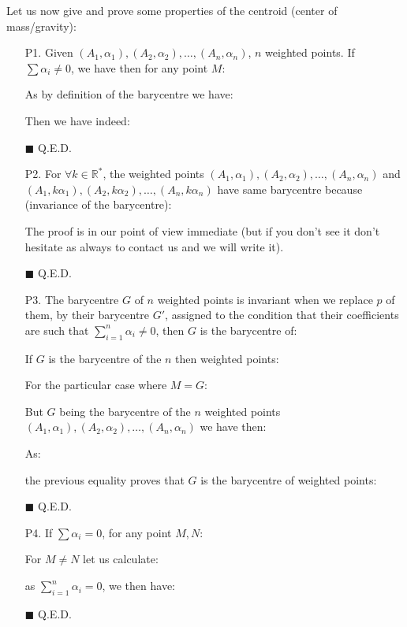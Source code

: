 	Let us now give and prove some properties of the centroid (center of mass/gravity):
	\begin{enumerate}
		\item[P1.] Given $(A_1,\alpha_1),(A_2,\alpha_2),\ldots,(A_n,\alpha_n)$, $n$ weighted points. If $\sum\alpha_i\neq 0$, we have then for any point $M$:
		
		\begin{dem}
		
		As by definition of the barycentre we have:
		
		Then we have indeed:
		
		\begin{flushright}
			$\blacksquare$  Q.E.D.
		\end{flushright}
		\end{dem}

		\item[P2.] For $\forall k\in\mathbb{R}^{*}$, the weighted points $(A_1,\alpha_1),(A_2,\alpha_2),\ldots,(A_n,\alpha_n)$ and $(A_1,k\alpha_1),(A_2,k\alpha_2),\ldots,(A_n,k\alpha_n)$ have same barycentre because (invariance of the barycentre):
	
		\begin{dem}
		The proof is in our point of view immediate (but if you don't see it don't hesitate as always to contact us and we will write it).
		\begin{flushright}
			$\blacksquare$  Q.E.D.
		\end{flushright}
		\end{dem}

		\item[P3.] The barycentre $G$ of $n$ weighted points is invariant when we replace $p$ of them, by their barycentre $G'$, assigned to the condition that their coefficients are such that $\sum_{i=1}^n \alpha_i\neq 0$, then $G$ is the barycentre of:
		
		\begin{dem}
		If $G$ is the barycentre of the $n$ then weighted points:
		
		For the particular case where $M = G$:
		
		But $G$ being the barycentre of the $n$ weighted points $(A_1,\alpha_1),(A_2,\alpha_2),\ldots,(A_n,\alpha_n)$ we have then:
		
		As:
		
		the previous equality proves that $G$ is the barycentre of weighted points:
		
		\begin{flushright}
			$\blacksquare$  Q.E.D.
		\end{flushright}
		\end{dem}

		\item[P4.] If $\sum \alpha_i=0$, for any point $M,N$:
		
		\begin{dem}
		For $M\neq N$ let us calculate:
	
		as $\sum_{i=1}^n \alpha_i=0$, we then have:
		
		\begin{flushright}
			$\blacksquare$  Q.E.D.
		\end{flushright}
		\end{dem}
	\end{enumerate}
